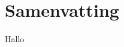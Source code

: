 \documentclass[main]{subfiles}
\begin{document}
\chapter{Samenvatting}\label{ch:samenvatting}

Hallo
\end{document}
